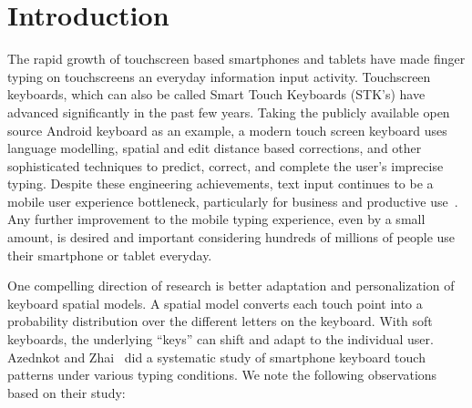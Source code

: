\documentclass{sigchi}
\begin{document}


\section{Introduction}
The rapid growth of touchscreen based smartphones and tablets have made finger typing on touchscreens an everyday information input activity. Touchscreen keyboards, which can also be called Smart Touch Keyboards (STK’s) have advanced significantly in the past few years. Taking the publicly available open source Android keyboard as an example, a modern touch screen keyboard uses language modelling, spatial and edit distance based corrections, and other sophisticated techniques to predict, correct, and complete the user’s imprecise typing. Despite these engineering achievements, text input continues to be a mobile user experience bottleneck, particularly for business and productive use~\cite{Bao:2011}. Any further improvement to the mobile typing experience, even by a small amount, is desired and important considering hundreds of millions of people use their smartphone or tablet everyday.

One compelling direction of research is better adaptation and personalization of keyboard spatial models. A spatial model converts each touch point into a probability distribution over the different letters on the keyboard. With soft keyboards, the underlying “keys” can shift and adapt to the individual user. Azednkot and Zhai~\cite{Azenkot:2012} did a systematic study of smartphone keyboard touch patterns under various typing conditions. We note the following observations based on their study:
\end{document}
